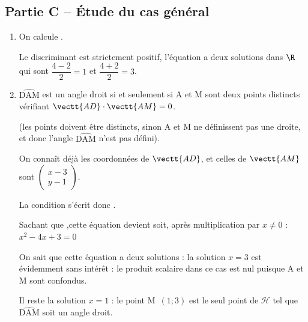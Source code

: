 \subsection*{Partie C -- Étude du cas général}

	\begin{enumerate}
		\item On calcule .

		Le discriminant est strictement positif, l'équation a deux solutions dans $\R$ qui sont {$\dfrac{4-2}{2}=1$} et {$\dfrac{4+2}{2}=3$}.

		\item $\widehat{\text{DAM}}$ est un angle droit si et seulement si A et M sont deux points distincts vérifiant {$\vectt{AD}\cdot\vectt{AM}=0$}.

		(les points doivent être distincts, sinon A et M ne définissent pas une droite, et donc l'angle $\widehat{\text{DAM}}$ n'est pas défini).

		On connaît déjà les coordonnées de {$\vectt{AD}$}, et celles de {$\vectt{AM}$} sont {$\left(\begin{array}{c}x-3\\ y-1\end{array}\right)$.}

		La condition s'écrit donc .

		Sachant que ,\quad cette équation devient  \quad soit, après multiplication par $x\neq0$ :
		\quad
		{$x^2-4x+3=0$}

		On sait que cette équation a deux solutions : la solution $x=3$ est évidemment sans intérêt : le produit scalaire dans ce cas est nul puisque A et M sont confondus.

		Il reste la solution $x=1$ : le point {M~$(1;3)$} est le seul point de {$\mathcal{H}$} tel que $\widehat{\text{DAM}}$ soit un angle droit.
	\end{enumerate}

